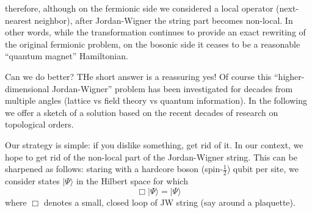therefore, although on the fermionic side we considered a local operator (next-nearest neighbor), after Jordan-Wigner the string part becomes non-local. In other words, while the transformation continues to provide an exact rewriting of the original fermionic problem, on the bosonic side it ceases to be a reasonable ``quantum magnet'' Hamiltonian.

Can we do better? THe short answer is a reassuring yes! Of course this ``higher-dimensional Jordan-Wigner'' problem has been investigated for decades from multiple angles (lattice vs field theory vs quantum information). In the following we offer a sketch of a solution based on the recent decades of research on topological orders.

Our strategy is simple: if you dislike something, get rid of it. In our context, we hope to get rid of the non-local part of the Jordan-Wigner string. This can be sharpened as follows: staring with a hardcore boson (spin-$\frac{1}{2}$) qubit per site, we consider states $|\Psi\rangle$ in the Hilbert space for which
\[ \Box |\Psi \rangle =|\Psi \rangle \]
where $\Box$ denotes a small, closed loop of JW string (say around a plaquette).

